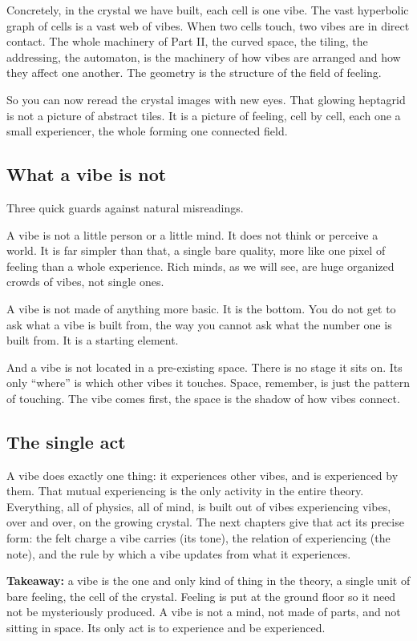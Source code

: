 Concretely, in the crystal we have built, each cell is one vibe. The vast hyperbolic graph of cells is a vast web of vibes. When two cells touch, two vibes are in direct contact. The whole machinery of Part II, the curved space, the tiling, the addressing, the automaton, is the machinery of how vibes are arranged and how they affect one another. The geometry is the structure of the field of feeling.

So you can now reread the crystal images with new eyes. That glowing heptagrid is not a picture of abstract tiles. It is a picture of feeling, cell by cell, each one a small experiencer, the whole forming one connected field.

\subsection{What a vibe is not}

Three quick guards against natural misreadings.

A vibe is not a little person or a little mind. It does not think or perceive a world. It is far simpler than that, a single bare quality, more like one pixel of feeling than a whole experience. Rich minds, as we will see, are huge organized crowds of vibes, not single ones.

A vibe is not made of anything more basic. It is the bottom. You do not get to ask what a vibe is built from, the way you cannot ask what the number one is built from. It is a starting element.

And a vibe is not located in a pre-existing space. There is no stage it sits on. Its only ``where'' is which other vibes it touches. Space, remember, is just the pattern of touching. The vibe comes first, the space is the shadow of how vibes connect.

\subsection{The single act}

A vibe does exactly one thing: it experiences other vibes, and is experienced by them. That mutual experiencing is the only activity in the entire theory. Everything, all of physics, all of mind, is built out of vibes experiencing vibes, over and over, on the growing crystal. The next chapters give that act its precise form: the felt charge a vibe carries (its tone), the relation of experiencing (the note), and the rule by which a vibe updates from what it experiences.

\textbf{Takeaway:} a vibe is the one and only kind of thing in the theory, a single unit of bare feeling, the cell of the crystal. Feeling is put at the ground floor so it need not be mysteriously produced. A vibe is not a mind, not made of parts, and not sitting in space. Its only act is to experience and be experienced.
